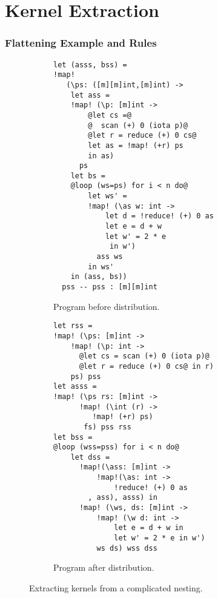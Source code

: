 \chapter{Kernel Extraction}
\label{chap:kernel-extraction}


\subsection{Flattening Example and Rules}
\label{subsec:kernel-extraction}

\begin{figure}
\begin{subfigure}{0.48\columnwidth}
\begin{lstlisting}[basicstyle=\sffamily\footnotesize]
let (asss, bss) =
!map!
   (\ps: ([m][m]int,[m]int) ->
    let ass =
    !map! (\p: [m]int ->
        @let cs =@
        @  scan (+) 0 (iota p)@
        @let r = reduce (+) 0 cs@
        let as = !map! (+r) ps
        in as)
      ps
    let bs =
    @loop (ws=ps) for i < n do@
        let ws' =
        !map! (\as w: int ->
            let d = !reduce! (+) 0 as
            let e = d + w
            let w' = 2 * e
             in w')
          ass ws
        in ws'
    in (ass, bs))
  pss -- pss : [m][m]int
\end{lstlisting}
\caption{Program before distribution.}
\label{fig:before-distrib}
\end{subfigure}
\begin{subfigure}{0.49\columnwidth}
\begin{lstlisting}[basicstyle=\sffamily\footnotesize]
let rss =
!map! (\ps: [m]int ->
    !map! (\p: int ->
      @let cs = scan (+) 0 (iota p)@
      @let r = reduce (+) 0 cs@ in r)
    ps) pss
let asss =
!map! (\ps rs: [m]int ->
      !map! (\int (r) ->
         !map! (+r) ps)
       fs) pss rss
let bss =
@loop (wss=pss) for i < n do@
    let dss =
      !map!(\ass: [m]int ->
          !map!(\as: int ->
              !reduce! (+) 0 as
        , ass), asss) in
      !map! (\ws, ds: [m]int ->
          !map! (\w d: int ->
              let e = d + w in
              let w' = 2 * e in w')
          ws ds) wss dss
\end{lstlisting}
\caption{Program after distribution.}
\label{fig:after-result}
\end{subfigure}
\caption{Extracting kernels from a complicated nesting.}
\end{figure}



